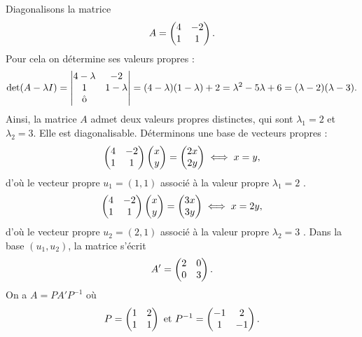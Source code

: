 \documentclass[class=report,crop=false]{standalone}
\begin{document}
\begin{exemple}
Diagonalisons la matrice 
$$A=\left(\begin{matrix}4&-2\cr1&1\cr\end{matrix}\right).$$
Pour cela on détermine ses valeurs propres :
$$\det(A-\lambda I)=\left|\begin{matrix}4-\lambda &-2\cr1&1-\lambda\cr\^o\end{matrix}\right|=(4-\lambda)(1-\lambda)+2=\lambda^2-5\lambda+6=(\lambda-2)(\lambda-3).$$
Ainsi, la matrice $A$ admet deux valeurs propres distinctes, qui sont $\lambda_1=2$ et $\lambda_2=3$. Elle est diagonalisable. Déterminons une base de vecteurs propres :
$$\left(\begin{matrix}4&-2\cr1&1\cr\end{matrix}\right)\left(\begin{matrix}x\cr y\end{matrix}\right)=
\left(\begin{matrix}2x\cr 2y\end{matrix}\right)\iff x=y,$$
d'où le vecteur propre $u_1=(1,1)$ associé à la valeur propre $\lambda_1=2$ . 
$$\left(\begin{matrix}4&-2\cr1&1\cr\end{matrix}\right)\left(\begin{matrix}x\cr y\end{matrix}\right)=
\left(\begin{matrix}3x\cr 3y\end{matrix}\right)\iff x=2y,$$
d'où le vecteur propre $u_2=(2,1)$ associé à la valeur propre $\lambda_2=3$ .
Dans la base $(u_1, u_2)$, la matrice s'écrit
$$A'=\left(\begin{matrix}2&0\cr0&3\cr\end{matrix}\right).$$
On a $A=PA'P^{-1}$ où
$$P=\left(\begin{matrix}1&2\cr1&1\cr\end{matrix}\right)\ {\hbox{et}}\ P^{-1}=\left(\begin{matrix}-1&2\cr1&-1\cr\end{matrix}\right).$$
\end{exemple}
\end{document}
